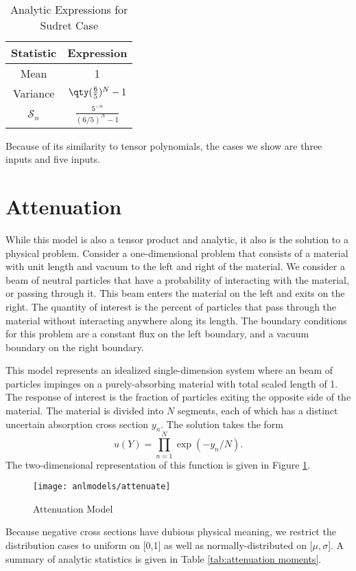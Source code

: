 \begin{table}[H]
  \centering
  \begin{tabular}{c c}
    Statistic & Expression \\\hline
    Mean & 1 \\
    Variance & $\qty(\frac{6}{5})^N - 1$ \\
    $\mathcal{S}_n$ & $\frac{5^{-n}}{(6/5)^N-1}$
  \end{tabular}
  \caption{Analytic Expressions for Sudret Case}
  \label{tab:sudret}
\end{table}
Because of its similarity to tensor polynomials, the cases we show are three inputs and five inputs.

\section{Attenuation}\label{mod:attenuation}
While this model is also a tensor product and analytic, it also is the solution to a physical problem.
Consider a one-dimensional problem that consists of a material with unit length and vacuum to the left and
right of the material.  We consider a beam of neutral particles that have a probability of interacting
with the material, or passing through it.  This beam enters the material on the left and exits on the right.
The quantity of interest is the percent of particles that pass through the material without interacting
anywhere along its length.  The boundary conditions for this problem are a constant flux on the left boundary,
and a vacuum boundary on the right boundary.

This model represents an idealized single-dimension system where an beam of particles impinges on a
purely-absorbing material with total scaled length of 1.  The response of interest is the fraction of
particles exiting the opposite side of the material.  The material is divided into $N$ segments, each of which
has a distinct uncertain absorption cross section $y_n$.  The solution takes the form
\begin{equation}
  u(Y) = \prod_{n=1}^N \exp(-y_n/N).
\end{equation}
The two-dimensional representation of this function is given in Figure \ref{fig: attenuation}.
\begin{figure}[htb]
  \centering
  \texttt{[image: anlmodels/attenuate]}
  \caption{Attenuation Model}
  \label{fig: attenuation}
\end{figure}
Because negative cross sections have dubious physical meaning, we restrict the distribution cases to uniform
on [0,1] as well as normally-distributed on [$\mu,\sigma$].  A summary of analytic statistics is given in
Table \ref{tab:attenuation moments}.

